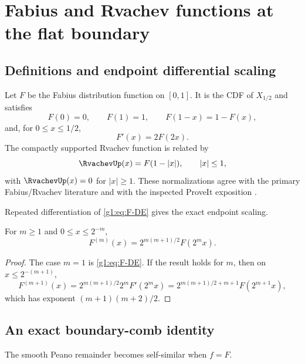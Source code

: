\section{Fabius and Rvachev functions at the flat boundary}
\label{g1:sec:fabius}

\subsection{Definitions and endpoint differential scaling}

Let $F$ be the Fabius distribution function on $[0,1]$.  It is the CDF of
$X_{1/2}$ and satisfies
\begin{equation}
 F(0)=0,\qquad F(1)=1,\qquad F(1-x)=1-F(x),
 \label{g1:eq:F-symmetry}
\end{equation}
and, for $0\le x\le1/2$,
\begin{equation}
 F'(x)=2F(2x).
 \label{g1:eq:F-DE}
\end{equation}
The compactly supported Rvachev function is related by
\begin{equation}
 \RvachevUp(x)=F(1-|x|),\qquad |x|\le1,
 \label{g1:eq:Up-F}
\end{equation}
with $\RvachevUp(x)=0$ for $|x|\ge1$.  These normalizations agree with the primary
Fabius/Rvachev literature \cite{Fabius1966,Rvachev1990,AriasDeReyna} and with
the inspected ProveIt exposition \cite{ProveItFabius}.

Repeated differentiation of \eqref{g1:eq:F-DE} gives the exact endpoint scaling.

\begin{lemma}
For $m\ge1$ and $0\le x\le2^{-m}$,
\begin{equation}
 F^{(m)}(x)=2^{m(m+1)/2}F(2^mx).
 \label{g1:eq:F-derivatives}
\end{equation}
\end{lemma}

\begin{proof}
The case $m=1$ is \eqref{g1:eq:F-DE}.  If the result holds for $m$, then on
$x\le2^{-(m+1)}$,
\[
 F^{(m+1)}(x)=2^{m(m+1)/2}2^mF'(2^mx)
 =2^{m(m+1)/2+m+1}F(2^{m+1}x),
\]
which has exponent $(m+1)(m+2)/2$.
\end{proof}

\subsection{An exact boundary-comb identity}

The smooth Peano remainder becomes self-similar when $f=F$.

